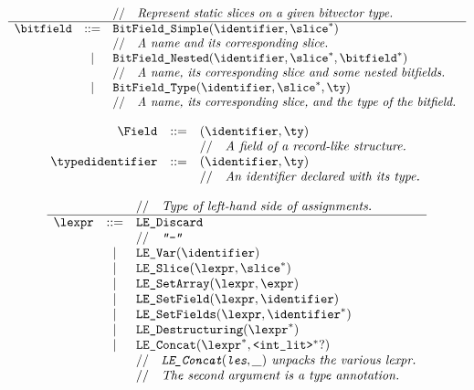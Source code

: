 \documentclass{book}
\begin{document}
\[
\begin{array}{rcl}
& & \ASTComment{Represent static slices on a given bitvector type.}\\
\hline
\bitfield &::=& \texttt{BitField\_Simple}(\identifier, \slice^{*}) \\
  & & \ASTComment{A name and its corresponding slice.}\\
  &|& \texttt{BitField\_Nested}(\identifier, \slice^{*}, \bitfield^{*}) \\
  & & \ASTComment{A name, its corresponding slice and some nested bitfields.}\\
  &|& \texttt{BitField\_Type}(\identifier, \slice^{*}, \ty) \\
  & & \ASTComment{A name, its corresponding slice, and the type of the bitfield.}\\
\end{array}
\]

\[
\begin{array}{rcl}
\Field &::=& (\identifier, \ty)\\
  & & \ASTComment{A field of a record-like structure.}\\
\typedidentifier &::=& (\identifier, \ty)\\
  & & \ASTComment{An identifier declared with its type.}\\
\end{array}
\]

\[
\begin{array}{rcl}
& & \ASTComment{Type of left-hand side of assignments.}\\
\hline
\lexpr &::=& \texttt{LE\_Discard}\\
  & & \ASTComment{\texttt{"-"}}\\
  &|& \texttt{LE\_Var}(\identifier)\\
  &|& \texttt{LE\_Slice}(\lexpr, \slice^*)\\
  &|& \texttt{LE\_SetArray}(\lexpr, \expr)\\
  &|& \texttt{LE\_SetField}(\lexpr, \identifier)\\
  &|& \texttt{LE\_SetFields}(\lexpr, \identifier^*)\\
  &|& \texttt{LE\_Destructuring}(\lexpr^*)\\
  &|& \texttt{LE\_Concat}(\lexpr^*, \texttt{<int\_lit>}^*?)\\
  & & \ASTComment{\texttt{LE\_Concat}$(\texttt{les}, \_)$ unpacks the various lexpr.}\\
  & & \ASTComment{The second argument is a type annotation.}\\
\end{array}
\]
\end{document}
